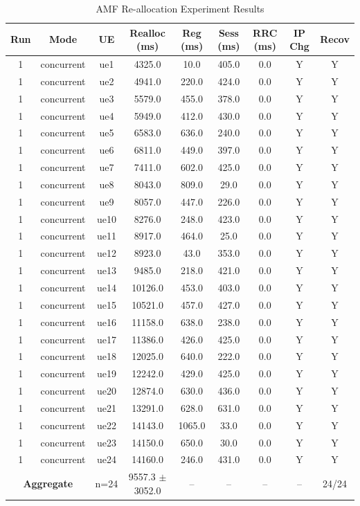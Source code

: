 \begin{table}[ht]
\centering
\begin{tabular}{|c|c|c|c|c|c|c|c|c|}
\hline
Run & Mode & UE & Realloc (ms) & Reg (ms) & Sess (ms) & RRC (ms) & IP Chg & Recov \\
\hline
1 & concurrent & ue1 & 4325.0 & 10.0 & 405.0 & 0.0 & Y & Y \\
1 & concurrent & ue2 & 4941.0 & 220.0 & 424.0 & 0.0 & Y & Y \\
1 & concurrent & ue3 & 5579.0 & 455.0 & 378.0 & 0.0 & Y & Y \\
1 & concurrent & ue4 & 5949.0 & 412.0 & 430.0 & 0.0 & Y & Y \\
1 & concurrent & ue5 & 6583.0 & 636.0 & 240.0 & 0.0 & Y & Y \\
1 & concurrent & ue6 & 6811.0 & 449.0 & 397.0 & 0.0 & Y & Y \\
1 & concurrent & ue7 & 7411.0 & 602.0 & 425.0 & 0.0 & Y & Y \\
1 & concurrent & ue8 & 8043.0 & 809.0 & 29.0 & 0.0 & Y & Y \\
1 & concurrent & ue9 & 8057.0 & 447.0 & 226.0 & 0.0 & Y & Y \\
1 & concurrent & ue10 & 8276.0 & 248.0 & 423.0 & 0.0 & Y & Y \\
1 & concurrent & ue11 & 8917.0 & 464.0 & 25.0 & 0.0 & Y & Y \\
1 & concurrent & ue12 & 8923.0 & 43.0 & 353.0 & 0.0 & Y & Y \\
1 & concurrent & ue13 & 9485.0 & 218.0 & 421.0 & 0.0 & Y & Y \\
1 & concurrent & ue14 & 10126.0 & 453.0 & 403.0 & 0.0 & Y & Y \\
1 & concurrent & ue15 & 10521.0 & 457.0 & 427.0 & 0.0 & Y & Y \\
1 & concurrent & ue16 & 11158.0 & 638.0 & 238.0 & 0.0 & Y & Y \\
1 & concurrent & ue17 & 11386.0 & 426.0 & 425.0 & 0.0 & Y & Y \\
1 & concurrent & ue18 & 12025.0 & 640.0 & 222.0 & 0.0 & Y & Y \\
1 & concurrent & ue19 & 12242.0 & 429.0 & 425.0 & 0.0 & Y & Y \\
1 & concurrent & ue20 & 12874.0 & 630.0 & 436.0 & 0.0 & Y & Y \\
1 & concurrent & ue21 & 13291.0 & 628.0 & 631.0 & 0.0 & Y & Y \\
1 & concurrent & ue22 & 14143.0 & 1065.0 & 33.0 & 0.0 & Y & Y \\
1 & concurrent & ue23 & 14150.0 & 650.0 & 30.0 & 0.0 & Y & Y \\
1 & concurrent & ue24 & 14160.0 & 246.0 & 431.0 & 0.0 & Y & Y \\
\multicolumn{2}{|c|}{\textbf{Aggregate}} & n=24 & 9557.3 $\pm$ 3052.0 & -- & -- & -- & -- & 24/24 \\
\hline
\end{tabular}
\caption{AMF Re-allocation Experiment Results}
\label{tab:amf_realloc}
\end{table}
